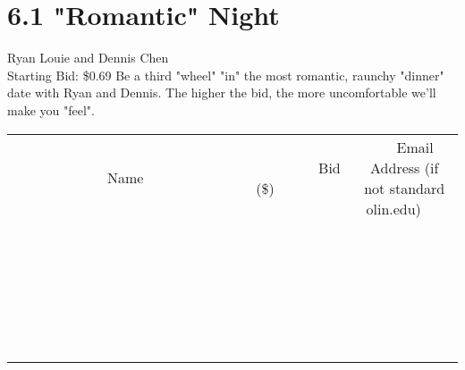 \documentclass[11pt]{article}
\begin{document}
\section*{6.1 "Romantic" Night}
Ryan Louie and Dennis Chen
\\
Starting Bid: \$0.69
\newline
Be a third "wheel" "in" the most romantic, raunchy "dinner" date with Ryan and Dennis.  The higher the bid, the more uncomfortable we'll make you "feel".
\\[6ex]
\begin{tabular}{c c c}
~~~~~~~~~~~~~Name~~~~~~~~~~~~~ & ~~~~~~~~~Bid (\$)~~~~~~~~~  & ~~~Email Address (if not standard olin.edu)~~~\\
 & & \\
\hline
 & & \\
\hline
 & & \\
\hline
 & & \\
\hline
 & & \\
\hline
 & & \\
\hline
 & & \\
\hline
 & & \\
\hline
 & & \\
\hline
 & & \\
\hline
 & & \\
\hline
 & & \\
\hline
 & & \\
\hline
 & & \\
\hline
 & & \\
\hline
 & & \\
\hline
 & & \\
\hline
 & & \\
\hline
 & & \\
\hline
 & & \\
\hline
 & & \\
\hline
 & & \\
\hline
 & & \\
\hline
 & & \\
\hline
 & & \\
\hline
 & & \\
\hline
\end{tabular}
\newpage
\end{document}
